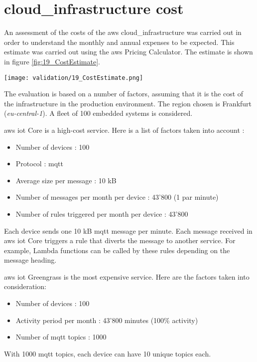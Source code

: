 
\section{\texorpdfstring{\Gls{cloud_infrastructure}}{} cost}

An assessment of the costs of the \gls{aws} \gls{cloud_infrastructure} was carried out in order to understand the monthly and annual expenses to be expected. This estimate was carried out using the \gls{aws} Pricing Calculator. The estimate is shown in figure \ref{fig:19_CostEstimate}.
\begin{center}
    \begingroup
    \texttt{[image: validation/19\_CostEstimate.png]}
    \label{fig:19_CostEstimate}
    \endgroup
\end{center}
The evaluation is based on a number of factors, assuming that it is the cost of the infrastructure in the production environment. The region chosen is Frankfurt (\textit{eu-central-1}). A fleet of 100 embedded systems is considered.

\gls{aws} \acrshort{iot} Core is a high-cost service. Here is a list of factors taken into account :
\begin{itemize}
    \item Number of devices : 100
    \item Protocol : \acrshort{mqtt}
    \item Average size per message : 10 kB
    \item Number of messages per month per device : 43'800 (1 par minute)
    \item Number of rules triggered per month per device : 43'800
\end{itemize}
Each device sends one 10 kB \acrshort{mqtt} message per minute. Each message received in \gls{aws} \acrshort{iot} Core triggers a rule that diverts the message to another service. For example, Lambda functions can be called by these rules depending on the message heading.

\gls{aws} \acrshort{iot} Greengrass is the most expensive service. Here are the factors taken into consideration:
\begin{itemize}
    \item Number of devices : 100
    \item Activity period per month : 43'800 minutes (100\% activity)
    \item Number of \acrshort{mqtt} topics : 1000
\end{itemize}
With 1000 \acrshort{mqtt} topics, each device can have 10 unique topics each.

